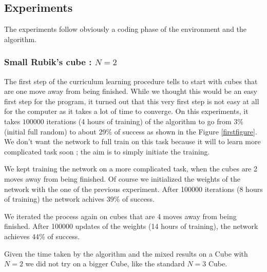 \documentclass{article} %
\begin{document}
\subsection{Experiments}
The experiments follow obviously a coding phase of the environment and the algorithm.

\subsubsection{Small Rubik's cube : $N=2$}
The first step of the curriculum learning procedure tells to start with cubes that are one move away from being finished. While we thought this would be an easy first step for the program, it turned out that this very first step is not easy at all for the computer as it takes a lot of time to converge. On this experiments, it takes $100000$ iterations (4 hours of training) of the algorithm to go from $3$\% (initial full random) to about $29$\% of success as shown in the Figure \ref{firstfigure}. We don't want the network to full train on this task because it will to learn more complicated task soon ; the aim is to simply initiate the training.

We kept training the network on a more complicated task, when the cubes are 2 moves away from being  finished. Of course we initialized the weights of the network with the one of the previous experiment. After 100000 iterations (8 hours of training) the network achives $39$\% of success.

We iterated the process again on cubes that are 4 moves away from being finished. After 100000 updates of the weights (14 hours of training), the network achieves $44$\% of success.

Given the time taken by the algorithm and the mixed results on a Cube with $N=2$ we did not try on a bigger Cube, like the standard $N=3$ Cube.
 
\end{document}
